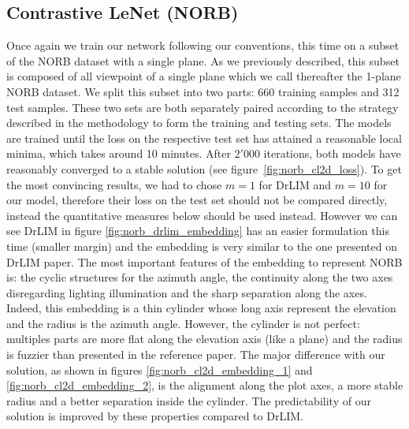 \documentclass[a4paper,12pt]{report}
\begin{document}
\subsection{Contrastive LeNet (NORB)}
Once again we train our network following our conventions, this time on a subset of the NORB dataset with a single plane.
As we previously described, this subset is composed of all viewpoint of a single plane which we call thereafter the 1-plane NORB dataset.
We split this subset into two parts: 660 training samples and 312 test samples.
These two sets are both separately paired according to the strategy described in the methodology to form the training and testing sets.
The models are trained until the loss on the respective test set has attained a reasonable local minima, which takes around 10 minutes.
After $2'000$ iterations, both models have reasonably converged to a stable solution (see figure~\ref{fig:norb_cl2d_loss}).
To get the most convincing results, we had to chose $m=1$ for DrLIM and $m=10$ for our model, therefore their loss on the test set should not be compared directly, instead the quantitative measures below should be used instead.
However we can see DrLIM in figure \ref{fig:norb_drlim_embedding} has an easier formulation this time (smaller margin) and the embedding is very similar to the one presented on DrLIM paper.
The most important features of the embedding to represent NORB is: the cyclic structures for the azimuth angle, the continuity along the two axes disregarding lighting illumination and the sharp separation along the axes.
Indeed, this embedding is a thin cylinder whose long axis represent the elevation and the radius is the azimuth angle.
However, the cylinder is not perfect: multiples parts are more flat along the elevation axis (like a plane) and the radius is fuzzier than presented in the reference paper.
The major difference with our solution, as shown in figures \ref{fig:norb_cl2d_embedding_1} and \ref{fig:norb_cl2d_embedding_2}, is the alignment along the plot axes, a more stable radius and a better separation inside the cylinder.
The predictability of our solution is improved by these properties compared to DrLIM.
\end{document}
